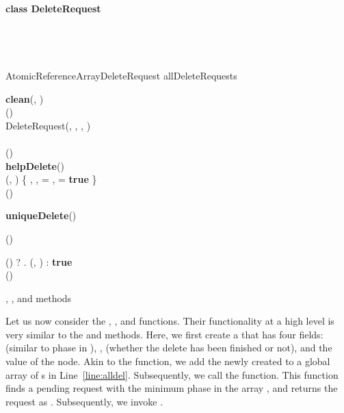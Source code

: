 \documentclass{llncs}
\begin{document}
\begin{appendix}
\begin{algorithm}
\small
\SetAlgoLined
\textbf{class DeleteRequest}{}\\
		\hspace{5mm} \\
		\hspace{5mm} \\
		\hspace{5mm} \\
        \hspace{5mm}  \\	

\vskip 2mm
AtomicReferenceArrayDeleteRequest allDeleteRequests

\caption{ } \label{alg:deleteclasses}
\end{algorithm}



\begin{algorithm}
\small
\SetAlgoLined
\textbf{clean}(, ){}\\
  ()\\
    DeleteRequest(, , , ) \\
[]    \label{line:alldel}\\
()\\


\textbf{helpDelete}(){}\\
			(, )    \{ ,   ,  = ,
 = \textbf{true} \} \\
			() \\
			\If{} {
				
			}
	
\textbf{uniqueDelete}(){}\\
		\While{}
		{
			  ()\\
			\If{! \label{line:deluniquepending} }
			{
				\If{}
				{
					  () ? . (,
) :
\textbf{true} \label{line:cleanCAS}\\
					()\\
					\If{} {
						
					}
				}
			}
		\Else{
				()
			}
		}
\caption{, , and  methods} \label{alg:clean}
\end{algorithm}
	
\normalsize
Let us now consider the , , and  functions. Their functionality at a high level
is very similar to the  and  methods.  Here, we first create a 
that has four fields:  (similar to phase in ), ,  (whether the delete
has been finished or not), and  the value of the  node. Akin to the  function,
we add the newly created  to a global array of s in Line~\ref{line:alldel}.
Subsequently, we call the  function. This function finds a pending request with the minimum phase
in the array , and returns the request as . Subsequently, we invoke .


\end{appendix}
\end{document}
